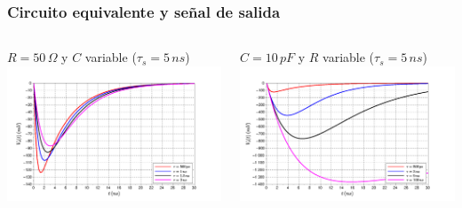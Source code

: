 \documentclass{beamer}
\begin{document}
\begin{frame}
\frametitle{Circuito equivalente y señal de salida}
\begin{columns}
\begin{column}{0.5\textwidth}
\begin{center}
\footnotesize{{\color{blue}$R = 50\,\Omega$ y $C$ variable ($\tau_s = 5\,ns$)}}
\includegraphics[width=1.1\textwidth]{d1/ec3_informe}
\end{center}
\end{column}
\begin{column}{0.5\textwidth}
\begin{center}
\footnotesize{{\color{blue}$C = 10\,pF$ y $R$ variable ($\tau_s = 5\,ns$)}}
\includegraphics[width=1.1\textwidth]{d1/ec3R_informe}
\end{center}
\end{column}
\end{columns}
\end{frame}
\end{document}
